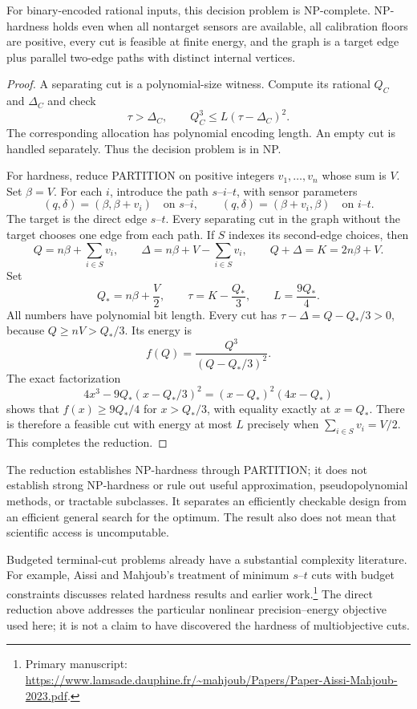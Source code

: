 \begin{theorem}
\label{thm:res-floor-hardness}
For binary-encoded rational inputs, this decision problem is NP-complete.
NP-hardness holds even when all nontarget sensors are available, all calibration floors
are positive, every cut is feasible at finite energy, and the graph is a target
edge plus parallel two-edge paths with distinct internal vertices.
\end{theorem}

\begin{proof}
A separating cut is a polynomial-size witness. Compute its rational $Q_C$ and
$\Delta_C$ and check
\[
 \tau>\Delta_C,\qquad Q_C^3\leq L(\tau-\Delta_C)^2.
\]
The corresponding allocation has polynomial encoding length. An empty cut is
handled separately. Thus the decision problem is in NP.

For hardness, reduce PARTITION on positive integers $v_1,\ldots,v_n$ whose sum
is $V$. Set $\beta=V$. For each $i$, introduce the path $s$--$i$--$t$, with
sensor parameters
\[
 (q,\delta)=(\beta,\beta+v_i)
 \quad\text{on }s\text{--}i,\qquad
 (q,\delta)=(\beta+v_i,\beta)
 \quad\text{on }i\text{--}t.
\]
The target is the direct edge $s$--$t$. Every separating cut in the graph
without the target chooses one edge from each path. If $S$ indexes its
second-edge choices, then
\[
 Q=n\beta+\sum_{i\in S}v_i,\qquad
 \Delta=n\beta+V-\sum_{i\in S}v_i,
 \qquad Q+\Delta=K=2n\beta+V.
\]
Set
\[
 Q_*=n\beta+\frac V2,\qquad
 \tau=K-\frac{Q_*}{3},\qquad
 L=\frac{9Q_*}{4}.
\]
All numbers have polynomial bit length. Every cut has
$\tau-\Delta=Q-Q_*/3>0$, because $Q\geq nV>Q_*/3$. Its energy is
\[
 f(Q)=\frac{Q^3}{(Q-Q_*/3)^2}.
\]
The exact factorization
\[
 4x^3-9Q_*(x-Q_*/3)^2=(x-Q_*)^2(4x-Q_*)
\]
shows that $f(x)\geq9Q_*/4$ for $x>Q_*/3$, with equality exactly at $x=Q_*$.
There is therefore a feasible cut with energy at most $L$ precisely when
$\sum_{i\in S}v_i=V/2$. This completes the reduction.
\end{proof}

The reduction establishes NP-hardness through PARTITION; it does not establish
strong NP-hardness or rule out useful approximation, pseudopolynomial methods,
or tractable subclasses. It separates an efficiently checkable design from
an efficient general search for the optimum. The result also does not mean
that scientific access is uncomputable.

Budgeted terminal-cut problems already have a substantial complexity literature.
For example, Aissi and Mahjoub's treatment of minimum $s$--$t$ cuts with budget
constraints discusses related hardness results and earlier work.\footnote{Primary
manuscript: \url{https://www.lamsade.dauphine.fr/~mahjoub/Papers/Paper-Aissi-Mahjoub-2023.pdf}.}
The direct reduction above addresses the particular nonlinear
precision--energy objective used here; it is not a claim to have discovered
the hardness of multiobjective cuts.

